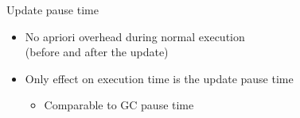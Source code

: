 % 


\begin{frame}{Update pause time}%
\begin{itemize}
\item No apriori overhead during normal execution \\
(before and after the update)
\item Only effect on execution time is the update pause time
  \begin{itemize}
  \item Comparable to GC pause time
  \end{itemize}
\end{itemize}
\end{frame}

